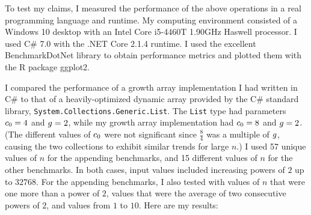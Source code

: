 To test my claims, I measured the performance of the above operations in a real programming language and runtime. My computing environment consisted of a Windows 10 desktop with an Intel Core i5-4460T 1.90GHz Haswell processor. I used C\# 7.0 with the .NET Core 2.1.4 runtime. I used the excellent BenchmarkDotNet library to obtain performance metrics and plotted them with the R package ggplot2.

I compared the performance of a growth array implementation I had written in C\# to that of a heavily-optimized dynamic array provided by the C\# standard library, \texttt{System.Collections.Generic.List}. The \texttt{List} type had parameters $c_0 = 4$ and $g = 2$, while my growth array implementation had $c_0 = 8$ and $g = 2$. (The different values of $c_0$ were not significant since $\frac{8}{4}$ was a multiple of $g$, causing the two collections to exhibit similar trends for large $n$.) I used 57 unique values of $n$ for the appending benchmarks, and 15 different values of $n$ for the other benchmarks. In both cases, input values included increasing powers of $2$ up to $32768$. For the appending benchmarks, I also tested with values of $n$ that were one more than a power of $2$, values that were the average of two consecutive powers of $2$, and values from $1$ to $10$. Here are my results:

